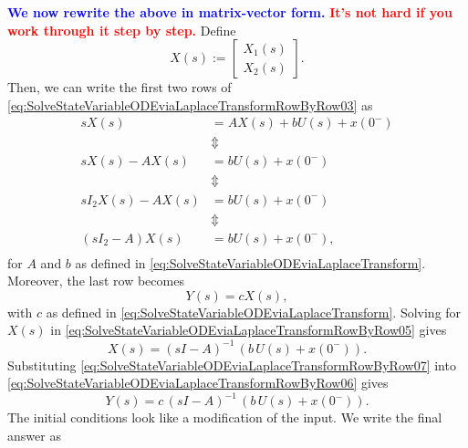 \textcolor{blue}{\bf We now rewrite the above in matrix-vector form.} \textcolor{red}{\bf It's not hard if you work through it step by step.} Define
\begin{equation}
 \label{eq:SolveStateVariableODEviaLaplaceTransformRowByRow04}
    X(s):=\left[ \begin{array}{c}
X_1(s) \\
X_2(s)
\end{array}
\right].
\end{equation}
Then, we can write the first two rows of \eqref{eq:SolveStateVariableODEviaLaplaceTransformRowByRow03} as
\begin{equation}
 \label{eq:SolveStateVariableODEviaLaplaceTransformRowByRow05}
 \begin{aligned}
      s X(s) &= A X(s) + b U(s) + x(0^-) \\
      & \Updownarrow \\
      s X(s) - A X(s) & = b U(s) + x(0^-) \\
      & \Updownarrow \\
      s I_2 X(s) - A X(s) & = b U(s) + x(0^-) \\
       & \Updownarrow \\
      \left(s I_2 - A \right) X(s) & = b U(s) + x(0^-), \\
 \end{aligned}  
\end{equation}
for $A$ and $b$ as defined in \eqref{eq:SolveStateVariableODEviaLaplaceTransform}. Moreover, the last row becomes
\begin{equation}
 \label{eq:SolveStateVariableODEviaLaplaceTransformRowByRow06}
 Y(s) = c X(s),
\end{equation}
with $c$ as defined in \eqref{eq:SolveStateVariableODEviaLaplaceTransform}. Solving for $X(s)$ in \eqref{eq:SolveStateVariableODEviaLaplaceTransformRowByRow05} gives
\begin{equation}
\label{eq:SolveStateVariableODEviaLaplaceTransformRowByRow07}
    X(s) = \left(sI - A \right)^{-1} \, \left(b \,  U(s) + x(0^-) \right).
\end{equation}
Substituting \eqref{eq:SolveStateVariableODEviaLaplaceTransformRowByRow07} into \eqref{eq:SolveStateVariableODEviaLaplaceTransformRowByRow06} gives 
\begin{equation}
    \label{eq:SolveStateVariableODEviaLaplaceTransformRowByRow08}
    Y(s) = c \, \left(sI - A \right)^{-1} \, \left( b \, U(s) + x(0^-) \right).
\end{equation}
The initial conditions look like a modification of the input. We write the final answer as
